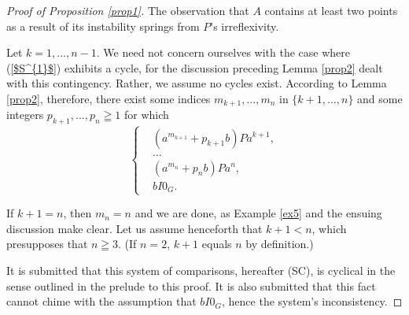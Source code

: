 \documentclass[pdflatex,sn-apa,11pt]{sn-jnl}%
\begin{document}
\begin{proof}[Proof of Proposition \ref{prop1}]
The observation that $A$ contains at least two points as a result of its instability springs from $P$'s irreflexivity.

Let $k = 1, ..., n-1$. We need not concern ourselves with the case where (\ref{$S^{1}$}) exhibits a cycle, for the discussion preceding Lemma \ref{prop2} dealt with this contingency. Rather, we assume no cycles exist. According to Lemma \ref{prop2}, therefore, there exist some indices $m_{k+1}, ..., m_{n}$ in $\{k+1, ..., n\}$ and some integers $p_{k+1}, ..., p_{n} \geqq 1$ for which
\begin{equation*}
  \left\{
    \begin{aligned}
      & (a^{m_{k+1}} + p_{k+1}b)Pa^{k+1}, \\
      & \dots \\
      & (a^{m_{n}} + p_{n}b)Pa^{n}, \\
      & bI{0_G}.
    \end{aligned}
  \right.
\end{equation*}

If $k+1 = n$, then $m_n = n$ and we are done, as Example \ref{ex5} and the ensuing discussion make clear. Let us assume henceforth that $k+1 < n$, which presupposes that $n \geqq 3$. (If $n = 2$, $k+1$ equals $n$ by definition.) 

It is submitted that this system of comparisons, hereafter (SC), is cyclical in the sense outlined in the prelude to this proof. It is also submitted that this fact cannot chime with the assumption that $bI0_G$, hence the system's inconsistency.





\end{proof}
\end{document}
